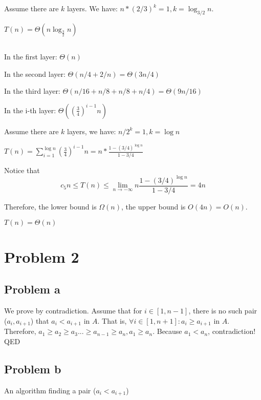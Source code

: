 \documentclass{article}
\begin{document}
Assume there are $k$ layers. We have: $n*(2/3)^k=1, k = \log_{3/2}{n}$.

$T(n) = \Theta(n\log_{\frac{3}{2}}{n})$

\subsection{}
In the first layer: $\Theta(n)$

In the second layer: $\Theta(n/4+2/n) = \Theta(3n/4)$

In the third layer: $\Theta(n/16+n/8+n/8+n/4)=\Theta(9n/16)$

In the i-th layer:
$\Theta((\frac{3}{4})^{i-1}n)$

Assume there are $k$ layers, we have: $n/{2^k}=1, k = \log{n}$

$T(n)=\sum_{i=1}^{\log{n}}(\frac{3}{4})^{i-1}n=n*\frac{1-(3/4)^{\log{n}}}{1-3/4}$

Notice that \[c_5n \leq T(n) \leq \lim_{n \to -\infty}n\frac{1-(3/4)^{\log{n}}}{1-3/4}=4n\]

Therefore, the lower bound is $\Omega(n)$, the upper bound is $O(4n)=O(n)$.

$T(n) = \Theta(n)$

\section{Problem 2}
\subsection{Problem a}
We prove by contradiction. Assume that for $i\in [1,n-1]$, there is no such pair ($a_i, a_{i+1}$) that $a_i < a_{i+1}$ in $A$. That is, $\forall i\in[1,n+1]: a_i \geq a_{i+1}$ in $A$. Therefore, $a_1 \geq a_2 \geq a_3 ... \geq a_{n-1} \geq a_{n}, a_1 \geq a_n$. Because $a_1 < a_n$, contradiction! QED
\subsection{Problem b}
\begin{algorithm}[!ht]
\DontPrintSemicolon
{}
      \;

\caption{An algorithm finding a pair ($a_i < a_{i+1}$)}
\end{algorithm}
\end{document}
